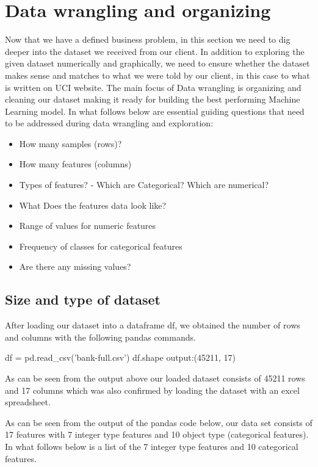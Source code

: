 \chapter{Data wrangling and organizing}
Now that we have a defined business problem, in this section we need to dig deeper into the dataset we received from our client. In addition to exploring the given dataset numerically and graphically, we need to ensure whether the dataset makes sense and matches to what we were told by our client, in this case to what is written on UCI website. The main
 focus of Data wrangling is organizing and cleaning our dataset making it ready for building the best performing Machine Learning model. In what follows below are essential guiding questions that need to be addressed during data wrangling and exploration:

\begin{itemize}
    \item How many samples (rows)?
\item How many features (columns)
\item Types of features? - Which are Categorical? Which are numerical?
\item What Does the features data look like?
\item Range of values for numeric features
\item Frequency of classes for categorical features
\item Are there any missing values?

\end{itemize}
\section{Size and type of dataset}
After loading our dataset into a dataframe {\color{blue} df}, we obtained the number of rows and columns with the following pandas commands. 
\begin{verbatim*}
df = pd.read_csv('bank-full.csv')
df.shape
output:(45211, 17)
\end{verbatim*}
As can be seen from the output above our loaded dataset consists of 45211 rows and 17 columns which was also confirmed by loading the dataset with an excel spreadsheet. 

As can be seen from the output of the pandas code below, our data set consists of 17 features with 7 integer type features and 10 object type (categorical features). In what follows below is a list of the 7 integer type features and 10 categorical features. 

